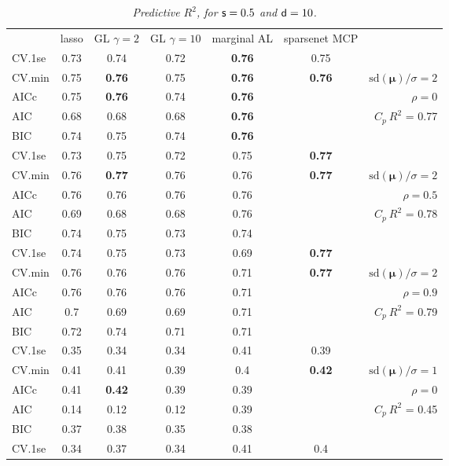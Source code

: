 \documentclass[12pt]{article}
\newcommand{\mr}[1]{\mathrm{#1}}
\newcommand{\bm}[1]{\mathbf{#1}}
\begin{document}
\begin{table}[p]\vspace{-.5cm}
\caption[l]{\label{r2}\it Predictive $R^2$, for ${\sf s}=0.5$ and  ${\sf d}=10$.}
\vspace{-.5cm}
\small{}
\begin{center}
\begin{tabular}{l*{5}{c}|r}
 & lasso & GL $\gamma=2$ & GL $\gamma=10$ & marginal AL & sparsenet MCP  &  \\
\cline{1-7}
CV.1se & 0.73 & 0.74 & 0.72 & {\bf 0.76} & 0.75 &\\
CV.min & 0.75 & {\bf 0.76} & 0.75 & {\bf 0.76} & {\bf 0.76} &  $\mr{sd}(\bm{\mu})/\sigma=2$ \\
AICc & 0.75 & {\bf 0.76} & 0.74 & {\bf 0.76} & & $\rho=0$ \\
AIC & 0.68 & 0.68 & 0.68 & {\bf 0.76} & & \multirow{2}{*}{$C_p ~ R^2$ = 0.77} \\
BIC & 0.74 & 0.75 & 0.74 & {\bf 0.76} & & \\
 \hline 
CV.1se & 0.73 & 0.75 & 0.72 & 0.75 & {\bf 0.77} &\\
CV.min & 0.76 & {\bf 0.77} & 0.76 & 0.76 & {\bf 0.77} &  $\mr{sd}(\bm{\mu})/\sigma=2$ \\
AICc & 0.76 & 0.76 & 0.76 & 0.76 & & $\rho=0.5$ \\
AIC & 0.69 & 0.68 & 0.68 & 0.76 & & \multirow{2}{*}{$C_p ~ R^2$ = 0.78} \\
BIC & 0.74 & 0.75 & 0.73 & 0.74 & & \\
 \hline 
CV.1se & 0.74 & 0.75 & 0.73 & 0.69 & {\bf 0.77} &\\
CV.min & 0.76 & 0.76 & 0.76 & 0.71 & {\bf 0.77} &  $\mr{sd}(\bm{\mu})/\sigma=2$ \\
AICc & 0.76 & 0.76 & 0.76 & 0.71 & & $\rho=0.9$ \\
AIC & 0.7 & 0.69 & 0.69 & 0.71 & & \multirow{2}{*}{$C_p ~ R^2$ = 0.79} \\
BIC & 0.72 & 0.74 & 0.71 & 0.71 & & \\
 \hline 
CV.1se & 0.35 & 0.34 & 0.34 & 0.41 & 0.39 &\\
CV.min & 0.41 & 0.41 & 0.39 & 0.4 & {\bf 0.42} &  $\mr{sd}(\bm{\mu})/\sigma=1$ \\
AICc & 0.41 & {\bf 0.42} & 0.39 & 0.39 & & $\rho=0$ \\
AIC & 0.14 & 0.12 & 0.12 & 0.39 & & \multirow{2}{*}{$C_p ~ R^2$ = 0.45} \\
BIC & 0.37 & 0.38 & 0.35 & 0.38 & & \\
 \hline 
CV.1se & 0.34 & 0.37 & 0.34 & 0.41 & 0.4 &\\

\end{tabular}
\end{center}
\end{table}
\end{document}
